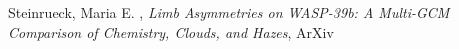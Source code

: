\item[{\color{numcolor}\scriptsize1}] Steinrueck, Maria E. , \emph{Limb Asymmetries on WASP-39b: A Multi-GCM Comparison of Chemistry, Clouds, and Hazes}, ArXiv